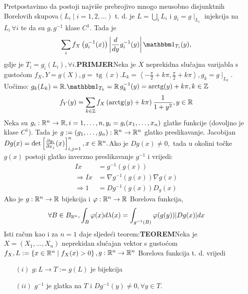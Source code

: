 \documentclass{article}
\newcommand{\tg}{\operatorname{tg}}
\newcommand{\arctg}{\operatorname{arctg}}
\begin{document}
Pretpostavimo da postoji najviše prebrojivo mnogo me\dj{}usobno disjunktnih Borelovih skupova\newline \((L_i\mid i=1,2,\ldots)\)  t. d. je \(L=\bigcup_iL_i\) i \(g_i=g\mid_{L_i}\) injekcija na \(L_i\,\forall i\) te da su \(g,g^{-1}\) klase \(C^1.\)  Tada je \[\sum_if_X\left(g_i^{-1}(x)\right)\left|\frac{d}{dy}g_i^{-1}(y)\right|\mathbbm 1_{T_i}(y),\] gdje je \(T_i=g_i(L_i),\forall i.\)\newline\newline\textbf{PRIMJER}\newline Neka je \(X\) neprekidna slučajna varijabla s gustoćom \(f_X, Y=g(X),g=\tg(x).\)\newline \(L_k=\left\langle-\frac\pi2+k\pi,\frac\pi2+k\pi\right\rangle,g_k=g\mid_{L_k}.\) Uočimo: \(g_k(L_k)=\Bbb R.\mathbbm 1_{T_k}=\Bbb R\)\newline \(g_k^{-1}(y)=\arctg(y)+k\pi,k\in\Bbb Z\)  \[f_Y(y)=\sum_{k\in\Bbb Z}f_X\left(\arctg(y)+k\pi\right)\frac1{1+y^2},y\in\Bbb R\]    
Neka su \(g_i:\Bbb R^n\to\Bbb R,i=1,\ldots,n,y_i=g_i(x_1,\ldots,x_n)\) glatke funkcije (dovoljno je klase \(C^1\)). Tada je \(g:=(g_1,\ldots,g_n):\Bbb R^n\to\Bbb R^n\) glatko preslikavanje. Jacobijan \(Dg(x)=\det\left[\frac{\partial g_i}{\partial x_j}(x)\right]_{i,j=1}^n,x\in\Bbb R^n.\)\newline Ako je \(Dg(x)\ne 0,\) tada u okolini točke \(g(x)\) postoji glatko inverzno preslikavanje \(g^{-1}\) i vrijedi:  \[\begin{aligned}Ix&=g^{-1}(g(x))\\\Rightarrow Ix&=\nabla g^{-1}(g(x))\nabla g(x)\\\Rightarrow 1&= Dg^{-1}(g(x))D_g(x)\end{aligned}\] Ako je \(g:\Bbb R^n\to\Bbb R\) bijekcija i \(\varphi:\Bbb R^n\to\Bbb R\) Borelova funkcija, \[\forall B\in B_{\Bbb R^n},\int_B\varphi(x)d\lambda(x)=\int_{g^{-1}(B)}\varphi(g(y))|Dg(x)|dx\] Isti račun kao i za \(n=1\) daje sljedeći teorem:\newline\newline\textbf{TEOREM}\newline Neka je \(X=(X_1,\ldots,X_n)\) neprekidan slučajan vektor s gustoćom \(f_X,L:=\left\{x\in\Bbb R^n\mid f_X(x)>0\right\},\)\newline\(g:\Bbb R^n\to\Bbb R^n\) Borelova funkcija t. d. vrijedi 
\begin{enumerate}
    \item[\((i)\)] \(g:L\to T:=g(L)\) je bijekcija
    \item[\((ii)\)] \(g^{-1}\) je glatka na \(T\) i \(Dg^{-1}(y)\ne 0,\forall y\in T.\)
\end{enumerate}
\end{document}
